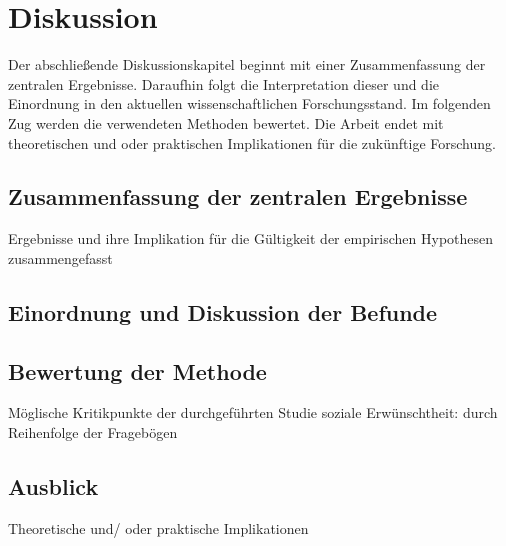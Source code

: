\chapter{Diskussion}   \label{ch_5}
Der abschließende Diskussionskapitel beginnt mit einer Zusammenfassung der zentralen Ergebnisse. Daraufhin folgt die Interpretation dieser und die Einordnung in den aktuellen wissenschaftlichen Forschungsstand. Im folgenden Zug werden die verwendeten Methoden bewertet. Die Arbeit endet mit theoretischen und oder praktischen Implikationen für die zukünftige Forschung.


\section{Zusammenfassung der zentralen Ergebnisse}  \label{sec_5.1}
Ergebnisse und ihre Implikation für die Gültigkeit der empirischen Hypothesen zusammengefasst


\section{Einordnung und Diskussion der Befunde}     \label{sec_5.2}


\section{Bewertung der Methode}
Möglische Kritikpunkte der durchgeführten Studie    \label{sec_5.3}
soziale Erwünschtheit: durch Reihenfolge der Fragebögen


\section{Ausblick}
Theoretische und/ oder praktische Implikationen     \label{sec_5.4}